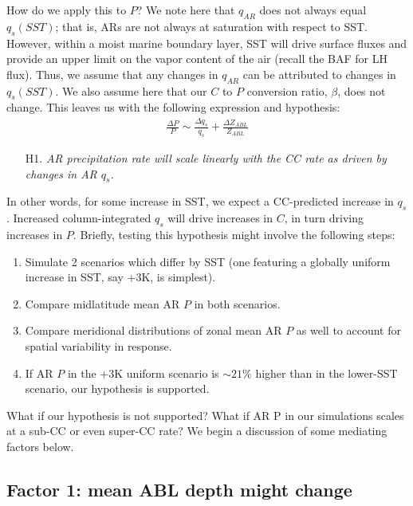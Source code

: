 \documentclass[letterpaper,12pt]{article}
\begin{document}
How do we apply this to $P$? We note here that $q_{AR}$ does not always equal $q_s(SST)$; that is, ARs are not always at saturation with respect to SST. However, within a moist marine boundary layer, SST will drive surface fluxes and provide an upper limit on the vapor content of the air (recall the BAF for LH flux). Thus, we assume that any changes in $q_{AR}$ can be attributed to changes in $q_s(SST)$. We also assume here that our $C$ to $P$ conversion ratio, $\beta$, does not change. This leaves us with the following expression and hypothesis: 
\begin{align}\label{eq:QsandP}
    \frac{\Delta P}P \sim \frac{\Delta q_s}{q_s} + \frac{\Delta Z_{ABL}}{Z_{ABL}}
\end{align}
\begin{itemize}
    \item[H1.] \textit{AR precipitation rate will scale linearly with the CC rate as driven by changes in AR $q_s$.} 
\end{itemize}
In other words, for some increase in SST, we expect a CC-predicted increase in $q_s$. Increased column-integrated $q_s$ will drive increases in $C$, in turn driving increases in $P$. Briefly, testing this hypothesis might involve the following steps: 
\begin{enumerate}[noitemsep]
    \item Simulate 2 scenarios which differ by SST (one featuring a globally uniform increase in SST, say +3K, is simplest).
    \item Compare midlatitude mean AR $P$ in both scenarios.
    \item Compare meridional distributions of zonal mean AR $P$ as well to account for spatial variability in response.
    \item If AR $P$ in the +3K uniform scenario is $\sim 21\%$ higher than in the lower-SST scenario, our hypothesis is supported. 
\end{enumerate}
What if our hypothesis is not supported? What if AR P in our simulations scales at a sub-CC or even super-CC rate? We begin a discussion of some mediating factors below. 

\subsection{Factor 1: mean ABL depth might change}
\end{document}
